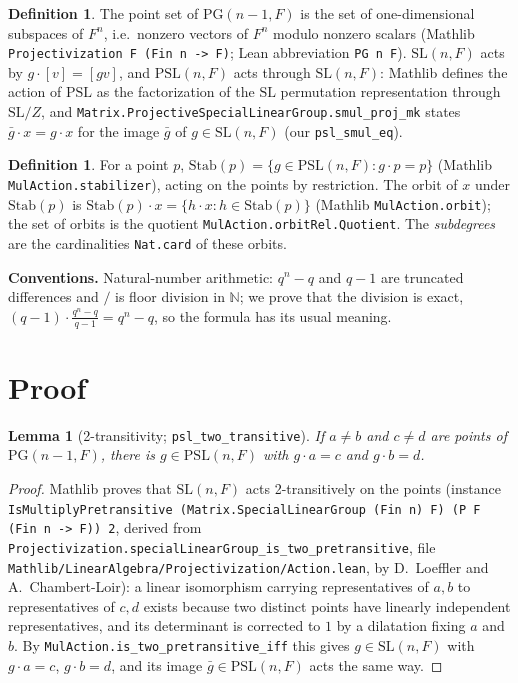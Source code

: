 \documentclass[11pt]{article}
\newtheorem{lemma}[theorem]{Lemma}
\theoremstyle{definition}
\newtheorem{definition}[theorem]{Definition}
\newcommand{\PSL}{\mathrm{PSL}}
\newcommand{\SL}{\mathrm{SL}}
\newcommand{\PG}{\mathrm{PG}}
\newcommand{\Stab}{\mathrm{Stab}}
\begin{document}
\begin{definition}
The point set of $\PG(n-1,F)$ is the set of one-dimensional subspaces of $F^n$, i.e.\ nonzero
vectors of $F^n$ modulo nonzero scalars (Mathlib \texttt{Projectivization F (Fin n -> F)}; Lean
abbreviation \texttt{PG n F}). $\SL(n,F)$ acts by $g\cdot[v]=[gv]$, and $\PSL(n,F)$ acts through
$\SL(n,F)$: Mathlib defines the action of $\PSL$ as the factorization of the $\SL$ permutation
representation through $\SL/Z$, and \texttt{Matrix.ProjectiveSpecialLinearGroup.smul\_proj\_mk}
states $\bar g\cdot x=g\cdot x$ for the image $\bar g$ of $g\in\SL(n,F)$ (our \texttt{psl\_smul\_eq}).
\end{definition}

\begin{definition}
For a point $p$, $\Stab(p)=\{g\in\PSL(n,F): g\cdot p=p\}$ (Mathlib \texttt{MulAction.stabilizer}),
acting on the points by restriction. The orbit of $x$ under $\Stab(p)$ is
$\Stab(p)\cdot x=\{h\cdot x : h\in\Stab(p)\}$ (Mathlib \texttt{MulAction.orbit}); the set of
orbits is the quotient \texttt{MulAction.orbitRel.Quotient}. The \emph{subdegrees} are the
cardinalities \texttt{Nat.card} of these orbits.
\end{definition}

\textbf{Conventions.} Natural-number arithmetic: $q^n-q$ and $q-1$ are truncated differences and
$/$ is floor division in $\mathbb{N}$; we prove that the division is exact,
$(q-1)\cdot\frac{q^n-q}{q-1}=q^n-q$, so the formula has its usual meaning.

\section{Proof}

\begin{lemma}[2-transitivity; \texttt{psl\_two\_transitive}]
If $a\neq b$ and $c\neq d$ are points of $\PG(n-1,F)$, there is $g\in\PSL(n,F)$ with
$g\cdot a=c$ and $g\cdot b=d$.
\end{lemma}
\begin{proof}
Mathlib proves that $\SL(n,F)$ acts 2-transitively on the points
(instance \texttt{IsMultiplyPretransitive (Matrix.SpecialLinearGroup (Fin n) F) (P F (Fin n -> F)) 2},
derived from \texttt{Projectivization.specialLinearGroup\_is\_two\_pretransitive}, file
\texttt{Mathlib/LinearAlgebra/Projectivization/Action.lean}, by D.~Loeffler and A.~Chambert-Loir):
a linear isomorphism carrying representatives of $a,b$ to representatives of $c,d$ exists because
two distinct points have linearly independent representatives, and its determinant is corrected
to $1$ by a dilatation fixing $a$ and $b$. By \texttt{MulAction.is\_two\_pretransitive\_iff} this gives
$g\in\SL(n,F)$ with $g\cdot a=c$, $g\cdot b=d$, and its image $\bar g\in\PSL(n,F)$ acts the same way.
\end{proof}
\end{document}
